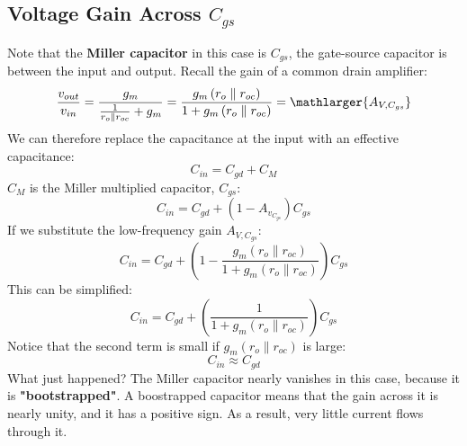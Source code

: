 \subsection{Voltage Gain Across \texorpdfstring{$C_{gs}$}{ the Gate-Source Capacitance}}
Note that the \textbf{Miller capacitor} in this case is $C_{gs}$, the gate-source capacitor is between the input and output.  Recall the gain of a common drain amplifier:
    \begin{equation}
        \frac{v_{out}}{v_{in}} = \frac{g_m}{\frac{1}{r_o \parallel r_{oc}} + g_m}
        = \frac{g_m \left(r_o \parallel r_{oc}\right)}{1 + g_m \left(r_o \parallel r_{oc}\right)}
        = \mathlarger{A_{V,{C_{gs}}}}
    \end{equation}
We can therefore replace the capacitance at the input with an effective capacitance:
    \begin{equation} 
        C_{in} = C_{gd} + C_M
    \end{equation}
$C_M$ is the Miller multiplied capacitor, $C_{gs}$:
    \begin{equation} 
        C_{in} = C_{gd} + (1 - A_{v_{C_{gs}}})C_{gs}
    \end{equation}
If we substitute the low-frequency gain $A_{V,{C_{gs}}}$:
    \begin{equation} 
        C_{in} = C_{gd} + \left(1 - \frac{g_m \left(r_o \parallel r_{oc}\right)}
                                            {1 + g_m \left(r_o \parallel r_{oc}\right)} \right)C_{gs}
    \end{equation}
This can be simplified:
    \begin{equation} 
        C_{in} = C_{gd} + \left(\frac{1}{1 + g_m \left(r_o \parallel r_{oc}\right)}\right)C_{gs}
    \end{equation}
Notice that the second term is small if $g_m(r_o \parallel r_{oc})$ is large:
    \begin{equation} 
        C_{in} \approx C_{gd}
    \end{equation}
What just happened?  The Miller capacitor nearly vanishes in this case, because it is \textbf{"bootstrapped"}.  A boostrapped capacitor means that the gain across it is nearly unity, and it has a positive sign.  As a result, very little current flows through it.
